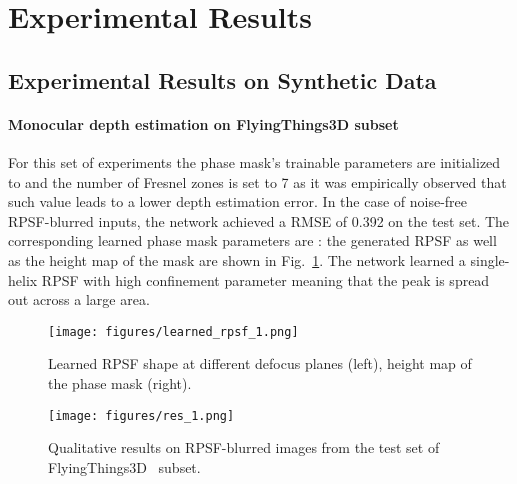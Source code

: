 \documentclass[preprint,5p,twocolumn]{elsarticle}
\begin{document}
\section{Experimental Results}
\label{sec:results}





\subsection{Experimental Results on Synthetic Data}
\label{subsec:depth_results}


\paragraph{Monocular depth estimation on FlyingThings3D subset}
For this set of experiments the phase mask's trainable parameters are initialized to  and the number of Fresnel zones  is set to 7 as it was empirically observed that such value leads to a lower depth estimation error. In the case of noise-free RPSF-blurred inputs, the network achieved a RMSE of 0.392 on the test set. The corresponding learned phase mask parameters are : the generated RPSF as well as the height map of the mask are shown in Fig.~\ref{fig:learndedrpsf1}. The network learned a single-helix RPSF with high confinement parameter  meaning that the peak is spread out across a large area.


\begin{figure}[h!]
\centering
\texttt{[image: figures/learned\_rpsf\_1.png]}
\caption{Learned RPSF shape at different defocus planes (left),  height map of the phase mask (right).}
\label{fig:learndedrpsf1}
\end{figure}

\begin{figure*}[h!]
\centering
\captionsetup{justification=centering}
\texttt{[image: figures/res\_1.png]}
\caption{Qualitative results on RPSF-blurred images from the test set of FlyingThings3D~\cite{MIFDB16} subset.}
\label{fig:res1}
\end{figure*}
\end{document}

